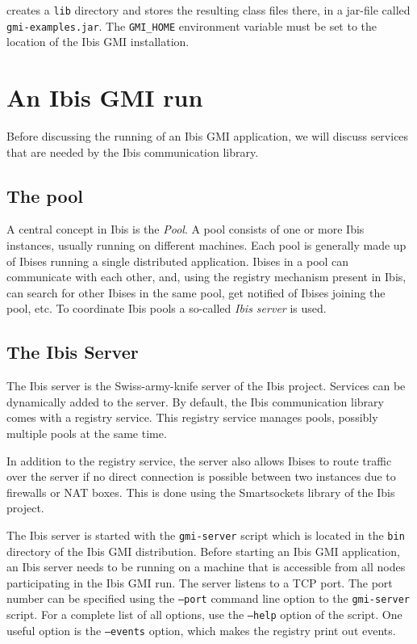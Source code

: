 \documentclass[a4paper,10pt]{article}
\begin{document}
creates a \texttt{lib} directory and stores the resulting class files there,
in a jar-file called \texttt{gmi-examples.jar}.
The \texttt{GMI\_HOME} environment variable must be set to the location of
the Ibis GMI installation.

\section{An Ibis GMI run}

Before discussing
the running of an Ibis GMI application, we will discuss services that are
needed by the Ibis communication library.

\subsection{The pool}

A central concept in Ibis is the \emph{Pool}. A pool consists of one or
more Ibis instances, usually running on different machines. Each pool is
generally made up of Ibises running a single distributed application.
Ibises in a pool can communicate with each other, and, using the
registry mechanism present in Ibis, can search for other Ibises in the
same pool, get notified of Ibises joining the pool, etc. To
coordinate Ibis pools a so-called \emph{Ibis server} is used.

\subsection{The Ibis Server}

The Ibis server is the Swiss-army-knife server of the Ibis project.
Services can be dynamically added to the server. By default, the Ibis
communication library comes with a registry service. This registry
service manages pools, possibly multiple pools at the same time.

In addition to the registry service, the server also allows
Ibises to route traffic over the server if no direct connection is
possible between two instances due to firewalls or NAT boxes. This is
done using the Smartsockets library of the Ibis project.

The Ibis server is started with the \texttt{gmi-server} script which is
located in the \texttt{bin} directory of the Ibis GMI distribution.  Before
starting an Ibis GMI application, an Ibis server needs to be running on a
machine that is accessible from all nodes participating in the Ibis GMI run.
The server listens to a TCP port. The port number can be specified using
the \texttt{--port} command line option to the \texttt{gmi-server}
script.  For a complete list of all options, use the \texttt{--help}
option of the script. One useful option is the  \texttt{--events}
option, which makes the registry print out events.
\end{document}
